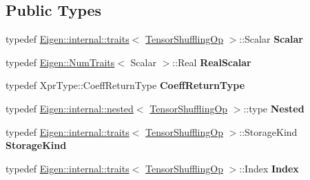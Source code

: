 \subsection*{Public Types}
\begin{DoxyCompactItemize}
\item 
\mbox{\label{class_eigen_1_1_tensor_shuffling_op_abcecc3da23f8a4b12eb8e292efcae1bf}} 
typedef \hyperlink{struct_eigen_1_1internal_1_1traits}{Eigen\+::internal\+::traits}$<$ \hyperlink{class_eigen_1_1_tensor_shuffling_op}{Tensor\+Shuffling\+Op} $>$\+::Scalar {\bfseries Scalar}
\item 
\mbox{\label{class_eigen_1_1_tensor_shuffling_op_a6dc9f172dc885288920ec4ced7e6ac99}} 
typedef \hyperlink{group___core___module_struct_eigen_1_1_num_traits}{Eigen\+::\+Num\+Traits}$<$ Scalar $>$\+::Real {\bfseries Real\+Scalar}
\item 
\mbox{\label{class_eigen_1_1_tensor_shuffling_op_a644ffc01e6884a8d46e0513418bb9dd3}} 
typedef Xpr\+Type\+::\+Coeff\+Return\+Type {\bfseries Coeff\+Return\+Type}
\item 
\mbox{\label{class_eigen_1_1_tensor_shuffling_op_a2b4e2a356b1537b7c860d7537ee110bd}} 
typedef \hyperlink{struct_eigen_1_1internal_1_1nested}{Eigen\+::internal\+::nested}$<$ \hyperlink{class_eigen_1_1_tensor_shuffling_op}{Tensor\+Shuffling\+Op} $>$\+::type {\bfseries Nested}
\item 
\mbox{\label{class_eigen_1_1_tensor_shuffling_op_a44b548a9d892d758070999011d2b77e8}} 
typedef \hyperlink{struct_eigen_1_1internal_1_1traits}{Eigen\+::internal\+::traits}$<$ \hyperlink{class_eigen_1_1_tensor_shuffling_op}{Tensor\+Shuffling\+Op} $>$\+::Storage\+Kind {\bfseries Storage\+Kind}
\item 
\mbox{\label{class_eigen_1_1_tensor_shuffling_op_afa8ab8ede7a72aa3d88b43beda7a5132}} 
typedef \hyperlink{struct_eigen_1_1internal_1_1traits}{Eigen\+::internal\+::traits}$<$ \hyperlink{class_eigen_1_1_tensor_shuffling_op}{Tensor\+Shuffling\+Op} $>$\+::Index {\bfseries Index}
\item 
\mbox{\label{class_eigen_1_1_tensor_shuffling_op_abcecc3da23f8a4b12eb8e292efcae1bf}} 

\end{DoxyCompactItemize}
